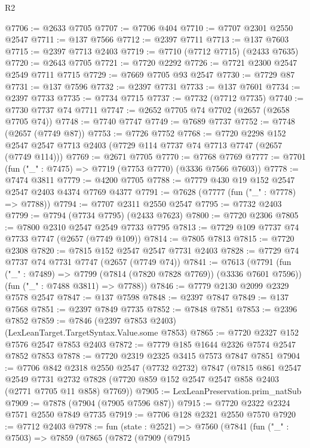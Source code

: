 \begin{lexlean}{R2}
\begin{coremodule}
@7706 := @2633 @7705
@7707 := @7706 @404
@7710 := @7707 @2301 @2550 @2547
@7711 := @137 @7566
@7712 := @2397 @7711
@7713 := @137 @7603
@7715 := @2397 @7713 @2403
@7719 := @7710 (@7712 @7715) (@2433 @7635)
@7720 := @2643 @7705
@7721 := @7720 @2292
@7726 := @7721 @2300 @2547 @2549 @7711 @7715
@7729 := @7669 @7705 @93 @2547
@7730 := @7729 @87
@7731 := @137 @7596
@7732 := @2397 @7731
@7733 := @137 @7601
@7734 := @2397 @7733
@7735 := @7734 @7715
@7737 := @7732 (@7712 @7735)
@7740 := @7730 @7737 @74 @7711
@7747 := @2652 @7705 @74 @7702 (@2657 (@2658 @7705 @74))
@7748 := @7740 @7747
@7749 := @7689 @7737
@7752 := @7748 (@2657 (@7749 @87))
@7753 := @7726 @7752
@7768 := @7720
    @2298
    @152
    @2547
    @2547
    @7713
    @2403
    (@7729 @114 @7737 @74 @7713 @7747 (@2657 (@7749 @114)))
@7769 := @2671 @7705
@7770 := @7768 @7769
@7777 := @7701 (fun ("_" : @7475) => @7719 (@7753 @7770) (@3336 @7566 @7603))
@7778 := @7474 @3811
@7779 := @4200 @7705
@7788 := @7779 @430 @19 @152 @2547 @2547 @2403 @4374 @7769 @4377
@7791 := @7628 (@7777 (fun ("_" : @7778) => @7788))
@7794 := @7707 @2311 @2550 @2547
@7795 := @7732 @2403
@7799 := @7794 (@7734 @7795) (@2433 @7623)
@7800 := @7720 @2306
@7805 := @7800 @2310 @2547 @2549 @7733 @7795
@7813 := @7729 @109 @7737 @74 @7733 @7747 (@2657 (@7749 @109))
@7814 := @7805 @7813
@7815 := @7720 @2308
@7820 := @7815 @152 @2547 @2547 @7731 @2403
@7828 := @7729 @74 @7737 @74 @7731 @7747 (@2657 (@7749 @74))
@7841 := @7613
    (@7791
      (fun ("_" : @7489) => @7799 (@7814 (@7820 @7828 @7769)) (@3336 @7601 @7596))
      (fun ("_" : @7488 @3811) => @7788))
@7846 := @7779 @2130 @2099 @2329 @7578 @2547
@7847 := @137 @7598
@7848 := @2397 @7847
@7849 := @137 @7568
@7851 := @2397 @7849 @7735
@7852 := @7848 @7851
@7853 := @2396 @7852
@7859 := @7846 (@2397 @7853 @2403) (LexLeanTarget.TargetSyntax.Value.some @7853)
@7865 := @7720 @2327 @152 @7576 @2547 @7853 @2403
@7872 := @7779 @185 @1644 @2326 @7574 @2547 @7852 @7853
@7878 := @7720 @2319 @2325 @3415 @7573 @7847 @7851
@7904 := @7706
    @842
    @2318
    @2550
    @2547
    (@7732 @2732)
    @7847
    (@7815
      @861
      @2547
      @2549
      @7731
      @2732
      @7828
      (@7720 @859 @152 @2547 @2547 @858 @2403 (@2771 @7705 @11 @858) @7769))
@7905 := LexLeanPreservation.prim_natSub
@7909 := @7878 (@7904 (@7905 @7596 @87))
@7915 := @7720 @2322 @2324 @7571 @2550 @7849 @7735
@7919 := @7706 @128 @2321 @2550 @7570
@7920 := @7712 @2403
@7978 := fun (state : @2521) =>
  @7560
    (@7841
      (fun ("_" : @7503) =>
      @7859
        (@7865
          (@7872
            (@7909
              (@7915

\end{coremodule}
\end{lexlean}
